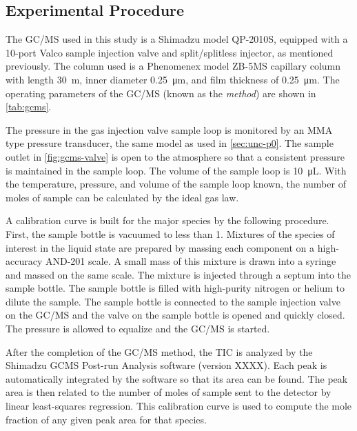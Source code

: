 \documentclass[../main.tex]{subfiles}
\begin{document}
\subsection{Experimental Procedure}
\label{sec:gcms-procedure}

The GC/MS used in this study is a
Shimadzu model QP-2010S, equipped with a 10-port Valco sample injection
valve and split/splitless injector, as mentioned previously. The column
used is a Phenomenex model ZB-5MS capillary column
with length \SI{30}{\meter}, inner diameter \SI{0.25}{\micro\meter}, and film
thickness of \SI{0.25}{\micro\meter}. The operating parameters of the GC/MS
(known as the \textit{method}) are shown in \cref{tab:gcms}.

The pressure in the gas injection valve sample loop is monitored by an
MMA type pressure transducer, the same model as used in \cref{sec:unc-p0}. The
sample outlet in \cref{fig:gcms-valve} is open to the atmosphere
so that a consistent pressure is maintained in the sample loop.
The volume of the sample loop is \SI{10}{\micro\liter}. With
the temperature, pressure, and volume of the sample loop known,
the number of moles of sample can be calculated by the ideal
gas law.

A calibration curve is built for the major species by the
following procedure. First, the sample bottle is vacuumed
to less than \SI{1}{\torr}. Mixtures of the species of
interest in the liquid state are prepared by massing each
component on a high-accuracy AND-201 scale. A small mass
of this mixture is drawn into a syringe and massed on the
same scale. The mixture is injected through a septum into
the sample bottle. The sample bottle is filled with
high-purity nitrogen or helium to dilute the sample. The sample
bottle is connected to the sample injection valve on the
GC/MS and the valve on the sample bottle is opened and
quickly closed. The pressure is allowed to equalize and
the GC/MS is started.

After the completion of the GC/MS method, the TIC is analyzed by the
Shimadzu GCMS Post-run Analysis software (version XXXX). Each peak is
automatically integrated by the software so that its area can be found.
The peak area is then related to the number of moles of
sample sent to the detector by linear least-squares regression.
This calibration curve is used to compute the mole fraction
of any given peak area for that species.
\end{document}
